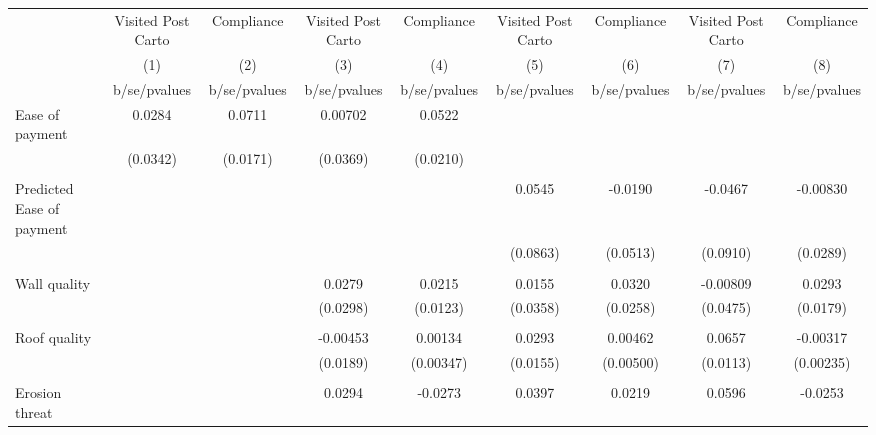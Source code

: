 {
\def\sym#1{\ifmmode^{#1}\else\(^{#1}\)\fi}
\begin{tabular}{l*{8}{c}}
\toprule
                &\multicolumn{1}{c}{Visited Post Carto}&\multicolumn{1}{c}{Compliance}&\multicolumn{1}{c}{Visited Post Carto}&\multicolumn{1}{c}{Compliance}&\multicolumn{1}{c}{Visited Post Carto}&\multicolumn{1}{c}{Compliance}&\multicolumn{1}{c}{Visited Post Carto}&\multicolumn{1}{c}{Compliance}\\
                &\multicolumn{1}{c}{(1)}&\multicolumn{1}{c}{(2)}&\multicolumn{1}{c}{(3)}&\multicolumn{1}{c}{(4)}&\multicolumn{1}{c}{(5)}&\multicolumn{1}{c}{(6)}&\multicolumn{1}{c}{(7)}&\multicolumn{1}{c}{(8)}\\
                &b/se/pvalues&b/se/pvalues&b/se/pvalues&b/se/pvalues&b/se/pvalues&b/se/pvalues&b/se/pvalues&b/se/pvalues\\
\midrule
Ease of payment &   0.0284&   0.0711&  0.00702&   0.0522&         &         &         &         \\
                & (0.0342)& (0.0171)& (0.0369)& (0.0210)&         &         &         &         \\
                &         &         &         &         &         &         &         &         \\
Predicted Ease of payment&         &         &         &         &   0.0545&  -0.0190&  -0.0467& -0.00830\\
                &         &         &         &         & (0.0863)& (0.0513)& (0.0910)& (0.0289)\\
                &         &         &         &         &         &         &         &         \\
Wall quality    &         &         &   0.0279&   0.0215&   0.0155&   0.0320& -0.00809&   0.0293\\
                &         &         & (0.0298)& (0.0123)& (0.0358)& (0.0258)& (0.0475)& (0.0179)\\
                &         &         &         &         &         &         &         &         \\
Roof quality    &         &         & -0.00453&  0.00134&   0.0293&  0.00462&   0.0657& -0.00317\\
                &         &         & (0.0189)&(0.00347)& (0.0155)&(0.00500)& (0.0113)&(0.00235)\\
                &         &         &         &         &         &         &         &         \\
Erosion threat  &         &         &   0.0294&  -0.0273&   0.0397&   0.0219&   0.0596&  -0.0253\\

\end{tabular}}
